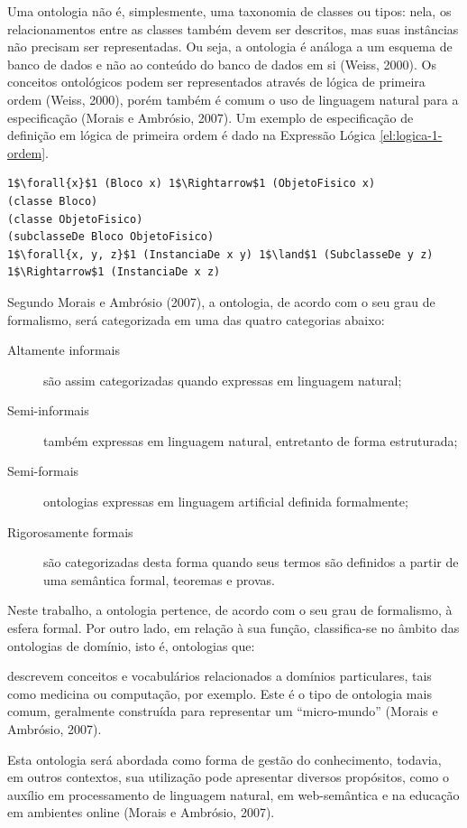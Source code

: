 Uma ontologia não é, simplesmente, uma taxonomia de classes ou tipos: nela, os relacionamentos entre as classes também devem ser descritos, mas suas instâncias não precisam ser representadas.  Ou seja, a ontologia é análoga a um esquema de banco de dados e não ao conteúdo do banco de dados em si (Weiss, 2000). Os conceitos ontológicos podem ser representados através de lógica de primeira ordem (Weiss, 2000), porém também é comum o uso de linguagem natural para a especificação (Morais e Ambrósio, 2007). Um exemplo de especificação de definição em lógica de primeira ordem é dado na Expressão Lógica \ref{el:logica-1-ordem}.


\vspace{0.4cm}
\begin{lstlisting}[label={el:logica-1-ordem},frame=single]
1$\forall{x}$1 (Bloco x) 1$\Rightarrow$1 (ObjetoFisico x)
(classe Bloco)
(classe ObjetoFisico)
(subclasseDe Bloco ObjetoFisico)
1$\forall{x, y, z}$1 (InstanciaDe x y) 1$\land$1 (SubclasseDe y z) 1$\Rightarrow$1 (InstanciaDe x z)
\end{lstlisting}


Segundo Morais e Ambrósio (2007),  a ontologia,  de acordo com o seu grau de formalismo, será categorizada em uma das quatro categorias abaixo:
\begin{description}
    \item [Altamente informais] são assim categorizadas quando expressas em linguagem natural;
    \item [Semi-informais] também expressas em linguagem natural, entretanto de forma estruturada;
    \item [Semi-formais] ontologias expressas em linguagem artificial definida formalmente;
    \item [Rigorosamente formais] são categorizadas desta forma quando seus termos são definidos a partir de uma semântica formal, teoremas e provas.
\end{description}

Neste trabalho, a ontologia pertence, de acordo com o seu grau de formalismo, à esfera formal. Por outro lado, em relação à sua função, classifica-se no âmbito das ontologias de domínio, isto é, ontologias que: 
\begin{directcite}
    descrevem conceitos e vocabulários relacionados a domínios particulares, tais como medicina ou computação, por exemplo.  Este é o tipo de ontologia mais comum, geralmente construída para representar um “micro-mundo” (Morais e Ambrósio, 2007).
\end{directcite}Esta ontologia será abordada como forma de gestão do conhecimento, todavia, em outros contextos,  sua utilização pode apresentar diversos propósitos,  como o auxílio em processamento de linguagem natural, em web-semântica e na educação em ambientes online (Morais e Ambrósio, 2007).

